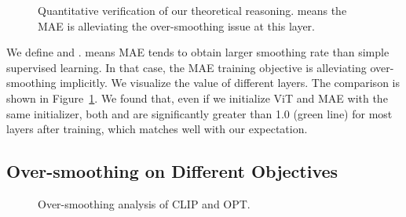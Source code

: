 \documentclass{article}
\theoremstyle{plain}
\theoremstyle{definition}
\theoremstyle{remark}
\begin{document}
\begin{figure}[t]
\centering
{}\vspace{-0.4cm}
\vspace{-0.35cm}
\caption{Quantitative verification of our theoretical reasoning.  means the MAE is alleviating the over-smoothing issue at this layer.}
\vspace{-0.4cm}
\label{fig: beta}
\end{figure}

We define  and . 
 means MAE tends to obtain larger smoothing rate than simple supervised learning. In that case, the MAE training objective is alleviating over-smoothing implicitly.
We visualize the  value of different layers. The comparison is shown in Figure~\ref{fig: beta}. We found that, even if we initialize ViT and MAE with the same initializer, both  and  are significantly greater than 1.0 (green line) for most layers after training, which matches well with our expectation.


\subsection{Over-smoothing on Different Objectives}

\begin{figure}[t]
\centering
{}\vspace{-0.4cm}
\vspace{-0.35cm}
\caption{Over-smoothing analysis of CLIP and OPT.}
\label{fig:clip-opt-over-smoothing}
\vspace{-0.4cm}
\end{figure}
\end{document}
